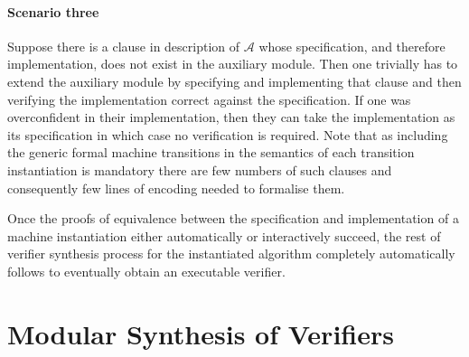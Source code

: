 \documentclass[10pt,conference]{IEEEtran}
\begin{document}
 \paragraph*{Scenario three} 
 Suppose there is a clause in description of $\mathcal{A}$ whose specification, and  therefore implementation,  does not exist in the auxiliary module. Then one trivially has to extend the auxiliary module by specifying and implementing that clause and then verifying the implementation correct against the specification.  If one was overconfident in their implementation, then they can take the implementation as its specification in which case  no verification is required.  Note that as including the generic formal machine transitions in the semantics of each transition instantiation is mandatory  
 there are few  numbers of such clauses and consequently few lines of encoding needed to formalise them. 
 
 Once the proofs of equivalence between the specification and implementation of a machine instantiation either automatically or interactively succeed, the rest of verifier synthesis process for the instantiated algorithm completely automatically follows to eventually obtain an executable verifier. 
\section{Modular Synthesis of Verifiers}\label{sec:Syn}
\end{document}

